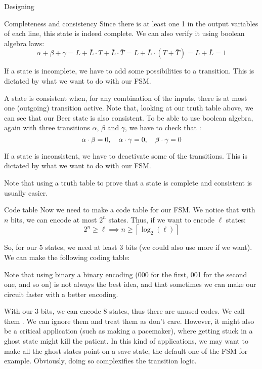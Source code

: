 \documentclass[a4paper]{article}
\begin{document}
\begin{parag}{Designing}
\begin{subparag}{Completeness and consistency}
        Since there is at least one 1 in the output variables of each line, this state is indeed complete. We can also verify it using boolean algebra laws: 
        \[\alpha + \beta + \gamma = L + \bar{L} \cdot T + \bar{L} \cdot \bar{T} = L + \bar{L}\cdot\left(T + \bar{T}\right) = L + \bar{L} = 1\]
        
        If a state is incomplete, we have to add some possibilities to a transition. This is dictated by what we want to do with our FSM.

        A state is consistent when, for any combination of the inputs, there is at most one (outgoing) transition active. Note that, looking at our truth table above, we can see that our Beer state is also consistent. To be able to use boolean algebra, again with three transitions $\alpha$, $\beta$ and $\gamma$, we have to check that :
        \[\alpha \cdot \beta = 0, \quad \alpha \cdot \gamma = 0, \quad \beta \cdot \gamma = 0\]

        If a state is inconsistent, we have to deactivate some of the transitions. This is dictated by what we want to do with our FSM.

        Note that using a truth table to prove that a state is complete and consistent is usually easier.
    \end{subparag}
    
    \begin{subparag}{Code table}
        Now we need to make a code table for our FSM. We notice that with $n$ bits, we can encode at most $2^{n}$ states. Thus, if we want to encode $\ell$ states:
        \[2^n \geq \ell \implies n \geq \left\lceil \log_2\left(\ell\right) \right\rceil \]
        
        So, for our 5 states, we need at least 3 bits (we could also use more if we want). We can make the following coding table:

        Note that using binary a binary encoding (000 for the first, 001 for the second one, and so on) is not always the best idea, and that sometimes we can make our circuit faster with a better encoding.

        With our 3 bits, we can encode 8 states, thus there are unused codes. We call them . We can ignore them and treat them as don't care. However, it might also be a critical application (such as making a pacemaker), where getting stuck in a ghost state might kill the patient. In this kind of applications, we may want to make all the ghost states point on a save state, the default one of the FSM for example. Obviously, doing so complexifies the transition logic.
    \end{subparag}


\end{parag}
\end{document}
